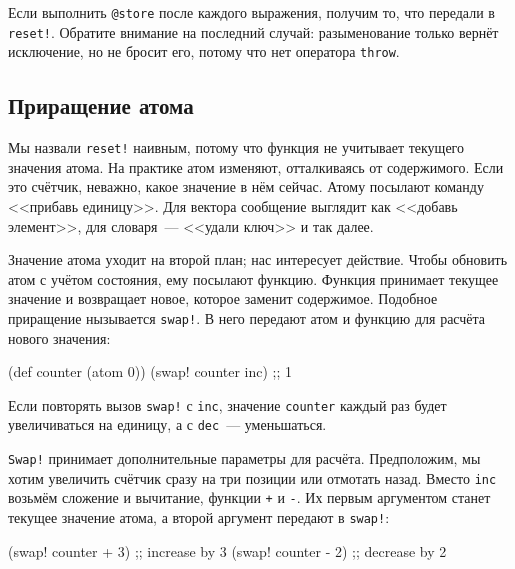 Если выполнить \verb|@store| после каждого выражения, получим то, что передали в
\verb|reset!|. Обратите внимание на последний случай: разыменование только
вернёт исключение, но не бросит его, потому что нет оператора \verb|throw|.

\subsection{Приращение атома}


Мы назвали \verb|reset!| наивным, потому что функция не учитывает текущего
значения атома. На практике атом изменяют, отталкиваясь от содержимого. Если это
счётчик, неважно, какое значение в нём сейчас. Атому посылают команду <<прибавь
единицу>>. Для вектора сообщение выглядит как <<добавь элемент>>, для
словаря~--- <<удали ключ>> и так далее.

Значение атома уходит на второй план; нас интересует действие. Чтобы обновить
атом с учётом состояния, ему посылают функцию. Функция принимает текущее
значение и возвращает новое, которое заменит содержимое. Подобное приращение
нызывается \verb|swap!|. В него передают атом и функцию для расчёта нового
значения:


\begin{english}
  \begin{clojure}
(def counter (atom 0))
(swap! counter inc) ;; 1
  \end{clojure}
\end{english}

\noindent
Если повторять вызов \verb|swap!| с \verb|inc|, значение \verb|counter| каждый
раз будет увеличиваться на единицу, а с \verb|dec|~--- уменьшаться.

\verb|Swap!| принимает дополнительные параметры для расчёта. Предположим, мы
хотим увеличить счётчик сразу на три позиции или отмотать назад. Вместо
\verb|inc| возьмём сложение и вычитание, функции \verb|+| и \verb|-|. Их
первым аргументом станет текущее значение атома, а второй аргумент передают в
\verb|swap!|:

\begin{english}
  \begin{clojure}
(swap! counter + 3) ;; increase by 3
(swap! counter - 2) ;; decrease by 2
  \end{clojure}
\end{english}

